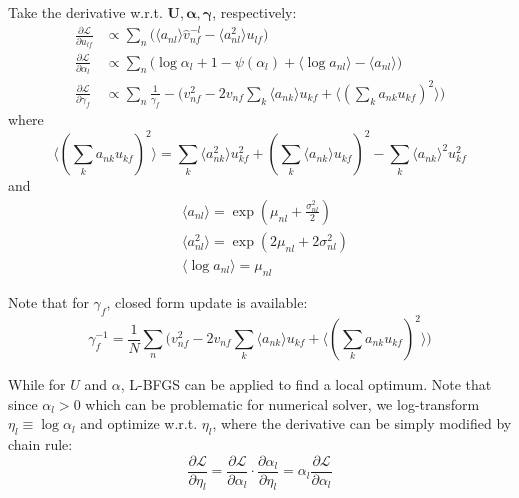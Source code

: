 \documentclass{article}
\begin{document}
Take the derivative w.r.t. $\mathbf{U}, \bm{\alpha}, \bm{\gamma}$, respectively:
\begin{align*}
\frac{\partial \mathcal{L}}{\partial u_{lf}} &\propto \sum_n \biggl( \langle a_{nl} \rangle \hat{v}_{nf}^{-l} - \langle a_{nl}^2 \rangle u_{lf} \biggl)\\
\frac{\partial \mathcal{L}}{\partial \alpha_l} &\propto  \sum_n \biggl( \log \alpha_l + 1 - \psi(\alpha_l) + \langle \log a_{nl} \rangle - \langle a_{nl} \rangle \biggl)\\
\frac{\partial \mathcal{L}}{\partial \gamma_f} &\propto \sum_n \frac{1}{\gamma_f} -  \biggl(v_{nf}^2 - 2 v_{nf}  \sum_k \langle a_{nk} \rangle u_{kf} +  \langle (\sum_k a_{nk} u_{kf})^2 \rangle \biggl)
\end{align*}
where 
\[
\langle (\sum_k a_{nk} u_{kf})^2 \rangle = \sum_k \langle a_{nk}^2 \rangle u_{kf}^2 + (\sum_k \langle a_{nk} \rangle u_{kf})^2 - \sum_k \langle a_{nk}\rangle ^2 u_{kf}^2
\]
and
\begin{align*}
&\langle a_{nl} \rangle = \exp(\mu_{nl} + \frac{\sigma_{nl}^2}{2})\\
&\langle a_{nl}^2 \rangle = \exp(2\mu_{nl} + 2\sigma_{nl}^2)\\
&\langle \log a_{nl} \rangle = \mu_{nl}
\end{align*}

Note that for $\gamma_f$, closed form update is available:
\begin{equation*}
\gamma_f^{-1} = \frac{1}{N}\sum_n \biggl(v_{nf}^2 - 2 v_{nf}  \sum_k \langle a_{nk} \rangle u_{kf} +  \langle (\sum_k a_{nk} u_{kf})^2 \rangle \biggl)
\end{equation*}

While for $U$ and $\alpha$, L-BFGS can be applied to find a local optimum. Note that since $\alpha_l > 0$ which can be problematic for numerical solver, we log-transform $\eta_l \equiv \log \alpha_l$ and optimize w.r.t. $\eta_l$, where the derivative can be simply modified by chain rule:
\[
\frac{\partial \mathcal{L}}{\partial \eta_l} = \frac{\partial \mathcal{L}}{\partial \alpha_l} \cdot \frac{\partial \alpha_l}{\partial \eta_l} = \alpha_l \frac{\partial \mathcal{L}}{\partial \alpha_l} 
\]
\end{document}
